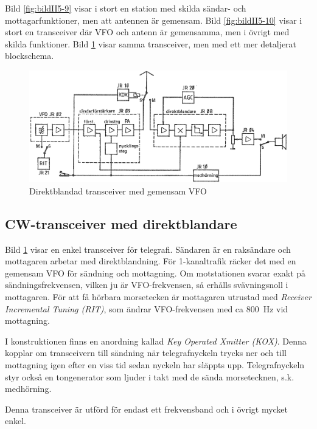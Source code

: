 Bild \ref{fig:bildII5-9} visar i stort en station med skilda sändar- och
mottagarfunktioner, men att antennen är gemensam.
Bild \ref{fig:bildII5-10} visar i stort en transceiver där VFO och antenn är
gemensamma, men i övrigt med skilda funktioner.
Bild \ref{fig:bildII5-11} visar samma transceiver, men med ett mer detaljerat
blockschema.

\begin{figure}
  \includegraphics[width=\textwidth]{images/cropped_pdfs/bild_2_5-11.pdf}
  \caption{Direktblandad transceiver med gemensam VFO}
  \label{fig:bildII5-11}
\end{figure}

\subsection{CW-transceiver med direktblandare}

Bild \ref{fig:bildII5-11} visar en enkel transceiver för telegrafi.
Sändaren är en raksändare och mottagaren arbetar med direktblandning.
För 1-kanaltrafik räcker det med en gemensam VFO för sändning och mottagning.
Om motstationen svarar exakt på sändningsfrekvensen, vilken ju är
VFO-frekvensen, så erhålls svävningsnoll i mottagaren.
För att få hörbara morsetecken är mottagaren utrustad med
\emph{Receiver Incremental Tuning (RIT)}, som ändrar VFO-frekvensen med
ca 800~Hz vid mottagning.

I konstruktionen finns en anordning kallad \emph{Key Operated Xmitter (KOX)}.
Denna kopplar om transceivern till sändning när telegrafnyckeln trycks ner och
till mottagning igen efter en viss tid sedan nyckeln har släppts upp.
Telegrafnyckeln styr också en tongenerator som ljuder i takt med de sända
morsetecknen, s.k. medhörning.

Denna transceiver är utförd för endast ett frekvensband och i övrigt
mycket enkel.


